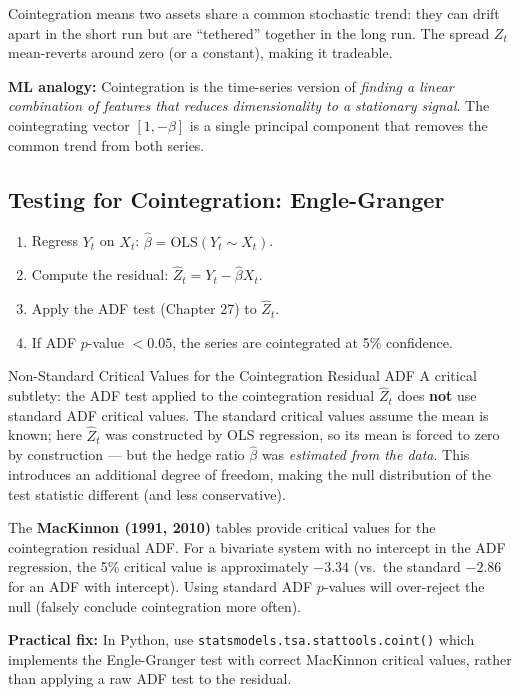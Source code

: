 \documentclass[12pt,a4paper,openany]{report}
\theoremstyle{definition}
\begin{document}
Cointegration means two assets share a common stochastic trend: they can drift apart in the short run but are ``tethered'' together in the long run. The spread $Z_t$ mean-reverts around zero (or a constant), making it tradeable.

\textbf{ML analogy:} Cointegration is the time-series version of \emph{finding a linear combination of features that reduces dimensionality to a stationary signal}. The cointegrating vector $[1, -\beta]$ is a single principal component that removes the common trend from both series.

\subsection{Testing for Cointegration: Engle-Granger}

\begin{enumerate}[label=\arabic*.]
  \item Regress $Y_t$ on $X_t$: $\hat{\beta} = \text{OLS}(Y_t \sim X_t)$.
  \item Compute the residual: $\hat{Z}_t = Y_t - \hat{\beta}X_t$.
  \item Apply the ADF test (Chapter 27) to $\hat{Z}_t$.
  \item If ADF $p$-value $< 0.05$, the series are cointegrated at 5\% confidence.
\end{enumerate}

\begin{warningbox}{Non-Standard Critical Values for the Cointegration Residual ADF}
A critical subtlety: the ADF test applied to the cointegration residual $\hat{Z}_t$ does \textbf{not} use standard ADF critical values. The standard critical values assume the mean is known; here $\hat{Z}_t$ was constructed by OLS regression, so its mean is forced to zero by construction — but the hedge ratio $\hat{\beta}$ was \emph{estimated from the data}. This introduces an additional degree of freedom, making the null distribution of the test statistic different (and less conservative).

The \textbf{MacKinnon (1991, 2010)} tables provide critical values for the cointegration residual ADF. For a bivariate system with no intercept in the ADF regression, the 5\% critical value is approximately $-3.34$ (vs.\ the standard $-2.86$ for an ADF with intercept). Using standard ADF $p$-values will over-reject the null (falsely conclude cointegration more often).

\textbf{Practical fix:} In Python, use \texttt{statsmodels.tsa.stattools.coint()} which implements the Engle-Granger test with correct MacKinnon critical values, rather than applying a raw ADF test to the residual.
\end{warningbox}
\end{document}
